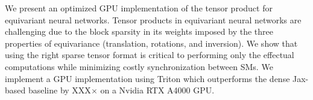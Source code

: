 We present an optimized GPU implementation of the tensor product for equivariant neural networks. Tensor products in equivariant neural networks are challenging due to the block sparsity in its weights imposed by the three properties of equivariance (translation, rotations, and inversion). We show that using the right sparse tensor format is critical to performing only the effectual computations while minimizing costly synchronization between SMs. We implement a GPU implementation using Triton which outperforms the dense Jax-based baseline by XXX$\times$ on a Nvidia RTX A4000 GPU.
